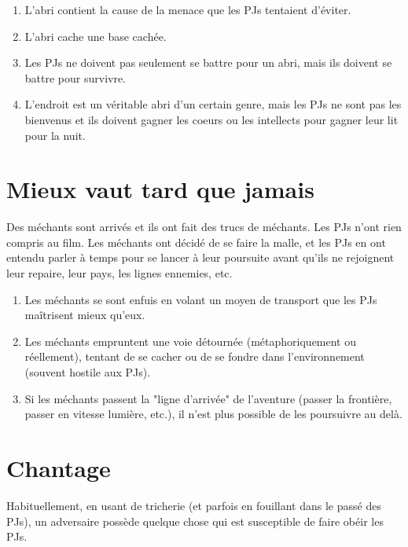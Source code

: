 \begin{multicols}{2}
\themes
\begin{enumerate}
\item L'abri contient la cause de la menace que les PJs tentaient d'éviter.
\item L'abri cache une base cachée.
\item Les PJs ne doivent pas seulement se battre pour un abri, mais ils doivent se battre pour survivre.
\item L'endroit est un véritable abri d'un certain genre, mais les PJs ne sont pas les bienvenus et ils doivent gagner les coeurs ou les intellects pour gagner leur lit pour la nuit.
\end{enumerate}

\section{Mieux vaut tard que jamais}
\hypertarget{mieuxvaut}{}


Des méchants sont arrivés et ils ont fait des trucs de méchants. Les PJs n'ont rien compris au film. Les méchants ont décidé de se faire la malle, et les PJs en ont entendu parler à temps pour se lancer à leur poursuite avant qu'ils ne rejoignent leur repaire, leur pays, les lignes ennemies, etc.

\themes
\begin{enumerate}
\item Les méchants se sont enfuis en volant un moyen de transport que les PJs maîtrisent mieux qu’eux.
\item Les méchants empruntent une voie détournée (métaphoriquement ou réellement), tentant de se cacher ou de se fondre dans l’environnement (souvent hostile aux PJs).
\item Si les méchants passent la "ligne d’arrivée" de l’aventure (passer la frontière, passer en vitesse lumière, etc.), il n’est plus possible de les poursuivre au delà.
\end{enumerate}


\section{Chantage}
\hypertarget{chantage}{}


Habituellement, en usant de tricherie (et parfois en fouillant dans le passé des PJs), un adversaire possède quelque chose qui est susceptible de faire obéir les PJs.


\end{multicols}
